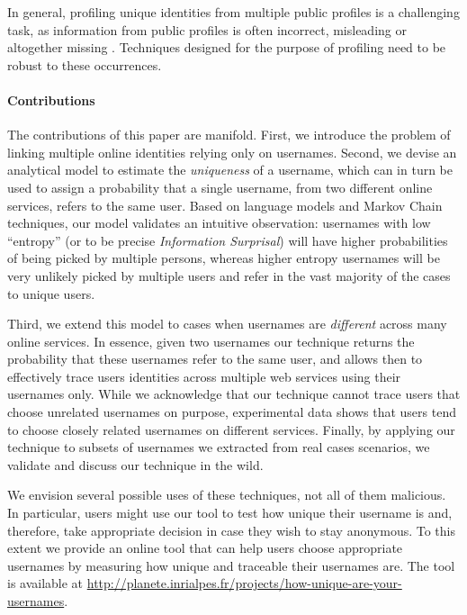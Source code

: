 \documentclass[letterpaper]{sig-alternate}
\begin{document}
In general, profiling unique identities from multiple public profiles is a
challenging task, as information from public profiles is often incorrect,
misleading or altogether missing \cite{footprint}. Techniques designed for the
purpose of profiling need to be robust to these occurrences.


\paragraph{Contributions} 

The contributions of this paper are manifold.
First, we introduce the problem of linking multiple online identities relying only
on usernames.
Second, we devise an analytical
model to estimate the {\em uniqueness} of a username,
which can in turn be used to assign a 
probability that a single username, from two
different online services, refers to the same user. Based on language models
and Markov Chain techniques, our model validates an intuitive observation:
usernames with low ``entropy'' (or to be precise {\em Information Surprisal}) will have higher probabilities of being picked
by multiple persons, whereas higher entropy usernames will be very
unlikely picked by multiple users and refer in the vast majority of the cases to unique users.

Third, we extend this model to cases when usernames are {\em different} across many
online services. In essence, given two usernames our technique returns
the probability that these usernames refer to the same user, and allows
then to effectively trace users identities across multiple
web services using their usernames only. 
While we acknowledge that our technique cannot trace users that choose
unrelated usernames on purpose, experimental data shows that
users tend to choose closely related usernames on different services.
Finally, by applying our technique to subsets of usernames we extracted from real
cases scenarios, we validate and discuss our technique in the wild.


We envision several possible uses of these techniques, not all of them malicious.
In particular, users might use our tool to test how unique their username is and, therefore,
take appropriate decision in case they wish to stay anonymous.
To this extent we provide an online tool that can help users choose appropriate
usernames by measuring how unique and traceable their usernames are. 
The tool is available at \url{http://planete.inrialpes.fr/projects/how-unique-are-your-usernames}.
\end{document}
